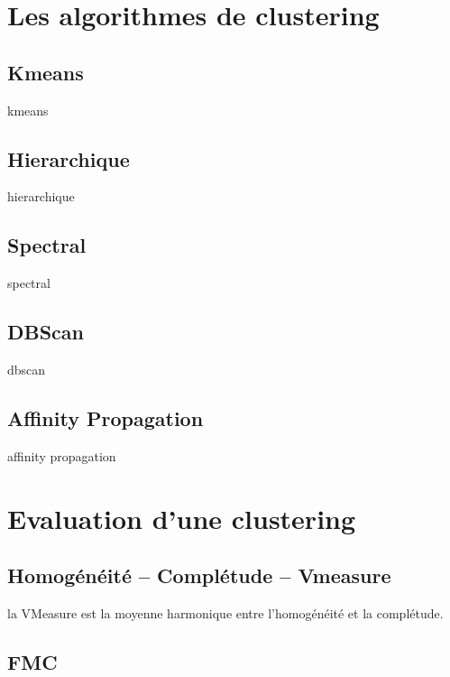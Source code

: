 \Annexes

\label{annex:A-ANNEXE-THEORIQUE}

	\minitoc

    \section{Les algorithmes de clustering }

        \subsection{Kmeans}
        kmeans 

        \subsection{Hierarchique}
        hierarchique 

        \subsection{Spectral}
        spectral 

        \subsection{DBScan}
        dbscan 

        \subsection{Affinity Propagation}
        affinity propagation 


    \section{Evaluation d’une clustering}

        \subsection{Homogénéité – Complétude – Vmeasure}
        la VMeasure  est la moyenne harmonique entre l'homogénéité et la complétude.
        
        \subsection{FMC}

